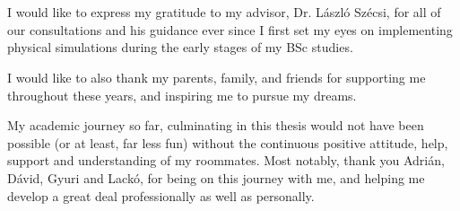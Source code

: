 \chapter*{\koszonetnyilvanitas}

I would like to express my gratitude to my advisor, Dr. László Szécsi, for all
of our consultations and his guidance ever since I first set my eyes on
implementing physical simulations during the early stages of my BSc studies.

I would like to also thank my parents, family, and friends for supporting me
throughout these years, and inspiring me to pursue my dreams.

My academic journey so far, culminating in this thesis would not have been
possible (or at least, far less fun) without the continuous positive attitude,
help, support and understanding of my roommates. Most notably, thank you Adrián,
Dávid, Gyuri and Lackó, for being on this journey with me, and helping me
develop a great deal professionally as well as personally.
